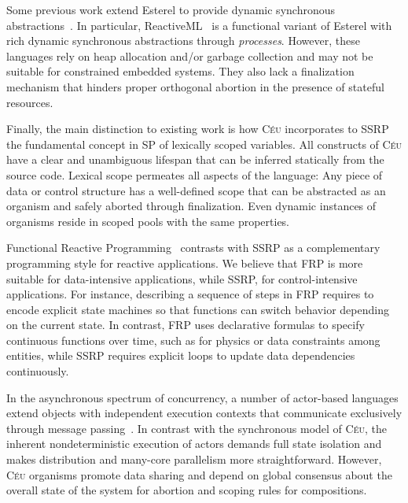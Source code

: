 \documentclass{sigplanconf}
\newcommand{\CEU}{\textsc{C\'{e}u}\xspace}
\newcommand{\1}{\;}
\newcommand{\2}{\;\;}
\newcommand{\3}{\;\;\;}
\newcommand{\5}{\;\;\;\;\;}
\begin{document}
Some previous work extend Esterel to provide dynamic synchronous 
abstractions~\cite{rp.scripts,rp.oo,sugarcubes}.
%
In particular, ReactiveML~\cite{rml} is a functional variant of Esterel with 
rich dynamic synchronous abstractions through \emph{processes}.
%
However, these languages rely on heap allocation and/or garbage collection and 
may not be suitable for constrained embedded systems.
%
%
They also lack a finalization mechanism that hinders proper orthogonal abortion 
in the presence of stateful resources.

Finally, the main distinction to existing work is how \CEU incorporates to SSRP 
the fundamental concept in SP of lexically scoped variables.
%
All constructs of \CEU have a clear and unambiguous lifespan that can be 
inferred statically from the source code.
%
Lexical scope permeates all aspects of the language:
Any piece of data or control structure has a well-defined scope that can be 
abstracted as an organism and safely aborted through finalization.
%
Even dynamic instances of organisms reside in scoped pools with the same 
properties.
%

Functional Reactive Programming~\cite{frp.principles} contrasts with SSRP as a
complementary programming style for reactive applications.
%
We believe that FRP is more suitable for data-intensive applications, while 
SSRP, for control-intensive applications.
%
For instance, describing a sequence of steps in FRP requires to encode explicit 
state machines so that functions can switch behavior depending on the current 
state.
%
In contrast, FRP uses declarative formulas to specify continuous functions over 
time, such as for physics or data constraints among entities, while SSRP 
requires explicit loops to update data dependencies continuously.

In the asynchronous spectrum of concurrency, a number of actor-based languages 
extend objects with independent execution contexts that communicate exclusively 
through message 
passing~\cite{agha.salsa,actors.thorn,actors.jcobox,actors.capsule}.
%
In contrast with the synchronous model of \CEU, the inherent nondeterministic 
execution of actors demands full state isolation and makes distribution and 
many-core parallelism more straightforward.
%
However, \CEU organisms promote data sharing and depend on global consensus 
about the overall state of the system for abortion and scoping rules for 
compositions.
\end{document}
